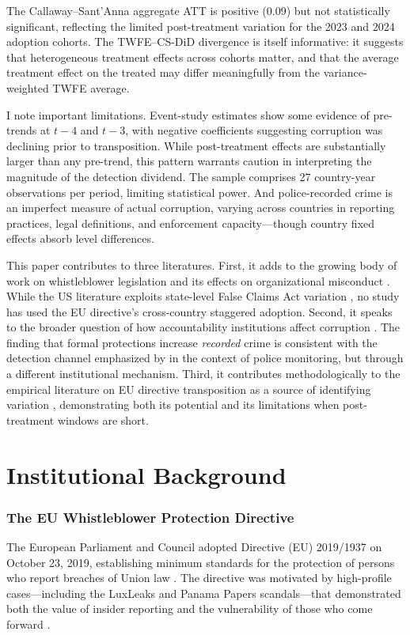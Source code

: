 \documentclass[12pt]{article}
\begin{document}
The Callaway--Sant'Anna aggregate ATT is positive (0.09) but not statistically significant, reflecting the limited post-treatment variation for the 2023 and 2024 adoption cohorts. The TWFE--CS-DiD divergence is itself informative: it suggests that heterogeneous treatment effects across cohorts matter, and that the average treatment effect on the treated may differ meaningfully from the variance-weighted TWFE average.

I note important limitations. Event-study estimates show some evidence of pre-trends at $t - 4$ and $t - 3$, with negative coefficients suggesting corruption was declining prior to transposition. While post-treatment effects are substantially larger than any pre-trend, this pattern warrants caution in interpreting the magnitude of the detection dividend. The sample comprises 27 country-year observations per period, limiting statistical power. And police-recorded crime is an imperfect measure of actual corruption, varying across countries in reporting practices, legal definitions, and enforcement capacity---though country fixed effects absorb level differences.

This paper contributes to three literatures. First, it adds to the growing body of work on whistleblower legislation and its effects on organizational misconduct \citep{dyck_morse_zingales_2010, call_2018, wilde_2017}. While the US literature exploits state-level False Claims Act variation \citep{engstrom_2014}, no study has used the EU directive's cross-country staggered adoption. Second, it speaks to the broader question of how accountability institutions affect corruption \citep{olken_2007, ferraz_finan_2008, avis_ferraz_finan_2018}. The finding that formal protections increase \textit{recorded} crime is consistent with the detection channel emphasized by \citet{di_tella_schargrodsky_2003} in the context of police monitoring, but through a different institutional mechanism. Third, it contributes methodologically to the empirical literature on EU directive transposition as a source of identifying variation \citep{alesina_tabellini_trebbi_2017, berglof_2007}, demonstrating both its potential and its limitations when post-treatment windows are short.

\section{Institutional Background}

\subsubsection*{The EU Whistleblower Protection Directive} The European Parliament and Council adopted Directive (EU) 2019/1937 on October 23, 2019, establishing minimum standards for the protection of persons who report breaches of Union law \citep{eu_directive_2019}. The directive was motivated by high-profile cases---including the LuxLeaks and Panama Papers scandals---that demonstrated both the value of insider reporting and the vulnerability of those who come forward \citep{vandekerckhove_2018}.
\end{document}
